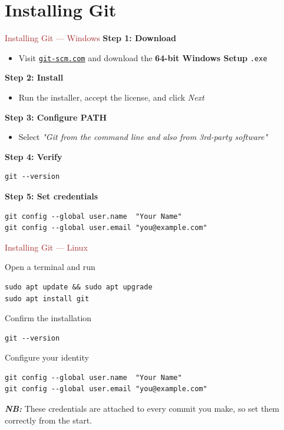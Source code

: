 \section{Installing Git}


\begin{frame}[fragile]{\textcolor{brown}{Installing Git — Windows}}
  \textbf{Step 1: Download}
  \begin{itemize}
    \item Visit \href{https://git-scm.com/install/windows}{\texttt{git-scm.com}} and download the \textbf{64-bit Windows Setup} \texttt{.exe}
  \end{itemize}

  \textbf{Step 2: Install}
  \begin{itemize}
    \item Run the installer, accept the license, and click \textit{Next}
  \end{itemize}

  \textbf{Step 3: Configure PATH}
  \begin{itemize}
    \item Select \textit{"Git from the command line and also from 3rd-party software"}
  \end{itemize}

  \textbf{Step 4: Verify}
\begin{lstlisting}[style=gitcode]
git --version
\end{lstlisting}

  \textbf{Step 5: Set credentials}
\begin{lstlisting}[style=gitcode]
git config --global user.name  "Your Name"
git config --global user.email "you@example.com"
\end{lstlisting}
\end{frame}


\begin{frame}[fragile]{\textcolor{brown}{Installing Git — Linux}}
  \begin{block}{Open a terminal and run}

\begin{lstlisting}[style=gitcode]
sudo apt update && sudo apt upgrade
sudo apt install git
\end{lstlisting}
\end{block}
  \begin{block}{Confirm the installation}
\begin{lstlisting}[style=gitcode]
git --version
\end{lstlisting}
\end{block}

  \begin{block}{Configure your identity}
\begin{lstlisting}[style=gitcode]
git config --global user.name  "Your Name"
git config --global user.email "you@example.com"
\end{lstlisting}
\end{block}

    \emph{\textbf{NB: }}These credentials are attached to every commit you make, so set them correctly from the start.
\end{frame}